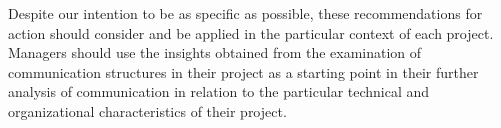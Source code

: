Despite our intention to be as specific as possible, these 
recommendations for action should consider and be applied in the
particular context of each project. Managers should use the
insights obtained from the examination of communication structures in their
project as a starting point in their further analysis of 
communication in relation to the particular technical and
organizational characteristics of their project.









